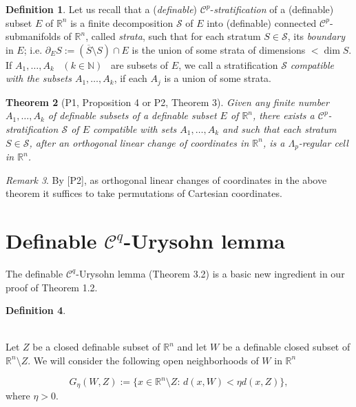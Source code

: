 \documentclass[12pt]{amsart}
\newtheorem{thm}{Theorem}[section]
\theoremstyle{definition}
\newtheorem{defn}[thm]{Definition}
\theoremstyle{remark}
\newtheorem{rem}[thm]{Remark}
\numberwithin{equation}{section}
\newcommand{\Real}{\mathbb R}
\newcommand{\Nat}{\mathbb N}
\begin{document}
\medskip
\begin{defn}

\medskip
Let us recall that a (\emph{definable}) $\mathcal C^p$-\emph{stratification} of a (definable) subset $E$ of $\Real^n$ is a finite decomposition $\mathcal S$ of $E$ into (definable) connected $\mathcal C^p$-submanifolds of $\Real^n$, called \emph{strata}, such that for each stratum $S\in \mathcal S$, its \emph{boundary} in $E$; i.e. $\partial_ES := (\overline{S}\setminus S)\cap E$ is the union of some strata of dimensions $< \dim S$. If $A_1,\dots, A_k$ \, $(k\in \Nat)$ \, are subsets of $E$, we call a stratification $\mathcal S$ \emph{compatible with the subsets $A_1,\dots, A_k$}, if each $A_j$ is a union of some strata.
\end{defn}



\begin{thm}[\lbrack P1, Proposition 4 or P2, Theorem 3\rbrack]
Given any finite number $A_1,\dots, A_k$ of definable subsets of a definable subset $E$ of $\Real^n$, there exists a $\mathcal C^p$-stratification $\mathcal S$ of $E$ compatible with sets $A_1,\dots, A_k$ and such that each stratum $S\in \mathcal S$, after an orthogonal linear change of coordinates in $\Real^n$, is a $\varLambda_p$-regular cell in $\Real^n$.
\end{thm}

\begin{rem} By [P2], as orthogonal linear changes of coordinates in the above theorem it suffices to take permutations of Cartesian coordinates.
\end{rem}

\bigskip
\section{Definable $\mathcal{C}^q$-Urysohn lemma}

\medskip
The definable $\mathcal{C}^q$-Urysohn lemma (Theorem 3.2) is a basic new ingredient in our proof of Theorem 1.2.

\medskip
\begin{defn}
$\phantom{.............................................................................................................................................}$

\medskip
Let $Z$ be a closed definable subset of $\Real^n$ and let $W$ be a definable closed subset of $\Real^n\setminus Z$. We will consider the following open neighborhoods of $W$ in $\Real^n$

$$
G_\eta(W, Z) :=\{x\in \Real^n\setminus Z: \, d(x, W) < \eta d(x, Z)\},
$$
where $\eta > 0$.
\end{defn}
\end{document}
